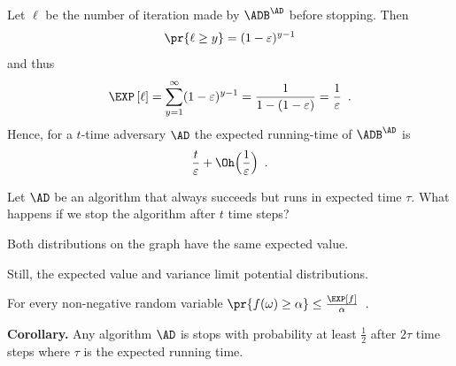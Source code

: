 \documentclass[landscape,footrule]{foils}
\newcommand{\lastline}{\vspace*{-2ex}}
\begin{document}
Let $\ell$ be the number of iteration made by $\ADB^\AD$ before
stopping. Then
\begin{align*}
  \pr{\ell\geq y} = (1-\varepsilon)^{y-1} 
\end{align*}
and thus
\begin{align*}
  \E{\ell}=\sum_{y=1}^\infty (1-\varepsilon)^{y-1}=\frac{1}{1-(1-\varepsilon)}=\frac{1}{\varepsilon}\enspace.
\end{align*}
Hence, for a $t$-time adversary $\AD$ the expected running-time of $\ADB^\AD$ is 
\begin{align*}
  \frac{t}{\varepsilon}+\Oh\Bigl(\frac{1}{\varepsilon}\Bigr)\enspace.
\end{align*}





Let $\AD$ be an algorithm that always succeeds but runs in expected
time $\tau$. What happens if we stop the algorithm after $t$ time steps?


\begin{triangles}
  \item Both distributions on the graph have the same expected value. 
  \item Still, the expected value and variance limit potential
    distributions.  \lastline
\end{triangles}



For every  non-negative random variable 
$ \pr{f(\omega)\geq \alpha}\leq \frac{\E{f}}{\alpha}\enspace$.


\textbf{Corollary.} Any algorithm $\AD$ is stops with probability at
least $\frac{1}{2}$ after $2\tau$ time steps where $\tau$ is the
expected running time.\lastline



\end{document}
